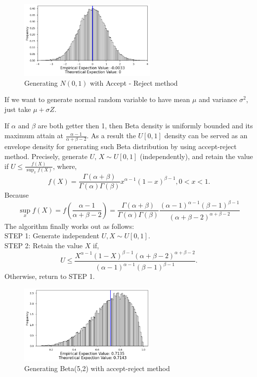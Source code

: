 \begin{example}
	\begin{figure}[H]

		\centering
		\includegraphics[width=0.6\textwidth]{images/nor_AR.png}
		\caption{Generating $N(0,1)$ with Accept - Reject method}
	\end{figure}

	If we want to generate normal random variable to have mean $\mu$  and variance $\sigma^2 $, just take $\mu +\sigma Z $.
\end{example}

\begin{example}
	\label{generate beta}
	If $\alpha$ and  $\beta $ are both getter then 1, then Beta density is uniformly bounded and its maximum attain at
	$\frac{\alpha-1}{\alpha+\beta-2}$. As a result the $U[0,1]$ density can be served as an envelope density for generating such Beta distribution by using accept-reject method.
	Precisely, generate $U$, $X\sim U[0,1]$ (independently), and retain the value if
	$U\le \frac{f(X)}{\sup_x f(X)}$, where,
	\[
		f(X)=\frac{\Gamma(\alpha+\beta)}{\Gamma(\alpha)\Gamma(\beta)}x^{\alpha-1} (1-x)^{\beta-1}, 0 < x< 1.
	\]
	Because
	\[
		\sup_x f(X) = f\left( \frac{\alpha-1}{\alpha+\beta-2} \right) = \frac{\Gamma(\alpha+\beta)}{\Gamma(\alpha)\Gamma(\beta)}\frac{(\alpha-1)^{\alpha-1} (\beta-1)^{\beta-1} }{(\alpha+\beta-2)^{\alpha+\beta-2} }
	\]
	The algorithm finally works out as follows:\\
	STEP 1: Generate independent $U,X \sim U[0,1]$.\\
	STEP 2: Retain the value $X$ if,
	\[
		U \le \frac{X^{\alpha-1} (1-X)^{\beta -1} (\alpha+\beta-2)^{\alpha+\beta-2} }{(\alpha-1)^{\alpha-1} (\beta-1)^{\beta-1} }.
	\]
	Otherwise, return to STEP 1.

	\begin{figure}[H]
		\centering
		\includegraphics[width=0.6\textwidth]{images/beta_AR.png}
		\caption{Generating Beta(5,2) with accept-reject method}
		\label{Beta 5 2}
	\end{figure}
\end{example}

